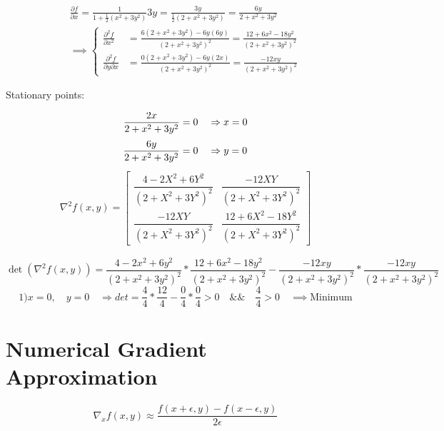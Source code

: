\documentclass[12pt]{article}         %
\begin{document}
$$
\begin{aligned}
\frac {\partial f}{\partial x} = \frac{1}{1+\frac{1}{2}(x^2+3y^2)}3y= \frac{3y}{\frac{1}{2}(2+x^2+3y^2)}=\frac{6y}{2+x^2+3y^2}\\
\implies 
	\left\{
	\begin{aligned}
		\frac {\partial^2 f}{\partial x^2}&=\frac{6(2+x^2+3y^2)-6y(6y)}{(2+x^2+3y^2)^2}=
		 	\frac{12+6x^2-18y^2}{(2+x^2+3y^2)^2} \\
		\frac {\partial^2 f}{\partial y \partial x}&=\frac{0(2+x^2+3y^2)-6y(2x)}{(2+x^2+3y^2)^2}=
		 	\frac{-12xy}{(2+x^2+3y^2)^2} 
	 \end{aligned} 
	 \right.
\end{aligned}
$$

Stationary points:

$$
\frac{2x}{2+x^2+3y^2}=0 \quad\Rightarrow x=0\\
$$
$$
\frac{6y}{2+x^2+3y^2}=0 \quad\Rightarrow y=0\\
$$
\begin{gather}
\nabla^2 f(x,y) = 
  \begin{bmatrix}
   \dfrac{4 - 2X^2 +6Y^2}{(2 + X^2 + 3Y^2)^2} &
   \dfrac{-12XY}{(2 + X^2 + 3Y^2)^2}\\
   \dfrac{-12XY}{(2 + X^2 + 3Y^2)^2} &
   \dfrac{12 + 6X^2 - 18Y^2}{(2 + X^2 + 3Y^2)^2} 
   \end{bmatrix}
    \nonumber
\end{gather}

$$
\det\left(\nabla^2 f(x,y)\right)=\frac{4-2x^2+6y^2}{(2+x^2+3y^2)^2} * \frac{12+6x^2-18y^2}{(2+x^2+3y^2)^2} - \frac{-12xy}{(2+x^2+3y^2)^2} *  \frac{-12xy}{(2+x^2+3y^2)^2}
$$
$$
1) x=0, \quad y=0 \quad\Rightarrow det=\frac{4}{4}*\frac{12}{4}-\frac{0}{4}*\frac{0}{4} > 0  \quad \&\& \quad \frac{4}{4} > 0 \quad\implies \text{Minimum}
$$



\section{Numerical Gradient Approximation}


\begin{equation}
	\nabla_x f(x,y) \approx \dfrac{f(x + \epsilon, y) - f(x - \epsilon, y)}{2\epsilon}
\end{equation}
\end{document}
